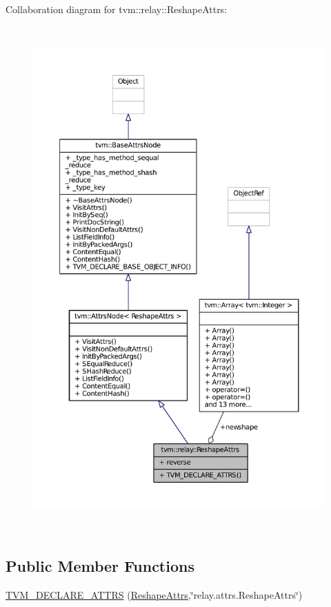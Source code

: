 Collaboration diagram for tvm\+:\+:relay\+:\+:Reshape\+Attrs\+:
\nopagebreak
\begin{figure}[H]
\begin{center}
\leavevmode
\includegraphics[height=550pt]{structtvm_1_1relay_1_1ReshapeAttrs__coll__graph}
\end{center}
\end{figure}
\subsection*{Public Member Functions}
\begin{DoxyCompactItemize}
\item 
\hyperlink{structtvm_1_1relay_1_1ReshapeAttrs_a62263922c82212f2ca5864b10e1958b7}{T\+V\+M\+\_\+\+D\+E\+C\+L\+A\+R\+E\+\_\+\+A\+T\+T\+RS} (\hyperlink{structtvm_1_1relay_1_1ReshapeAttrs}{Reshape\+Attrs},\char`\"{}relay.\+attrs.\+Reshape\+Attrs\char`\"{})
\end{DoxyCompactItemize}
